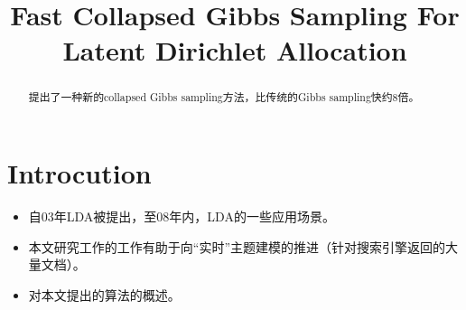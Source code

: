 \documentclass{article}
\begin{document}
\title{Fast Collapsed Gibbs Sampling For Latent Dirichlet Allocation}
\date{}
\maketitle

\begin{abstract}
提出了一种新的collapsed Gibbs sampling方法，比传统的Gibbs sampling快约8倍。
\end{abstract}

\section{Introcution}
\begin{itemize}
	\item 自03年LDA被提出，至08年内，LDA的一些应用场景。
	\item 本文研究工作的工作有助于向“实时”主题建模的推进（针对搜索引擎返回的大量文档）。
	\item 对本文提出的算法的概述。
\end{itemize}
\end{document}
